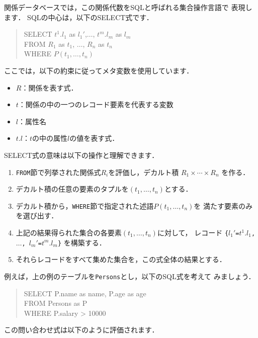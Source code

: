 \documentclass{jbook}
\newenvironment{program}{\begin{quote}\begin{tt}}%
                        {\end{tt}\end{quote}}
\begin{document}
	関係データベースでは，この関係代数をSQLと呼ばれる集合操作言語で
表現します．
	SQLの中心は，以下のSELECT式です．
\begin{program}
SELECT $t^1.l_1$ as $l_1'$,$\ldots$, $t^m.l_m$ as $l_m$\\
FROM $R_1$ as $t_1$, $\ldots$, $R_n$ as $t_n$\\
WHERE $P(t_1,\ldots, t_n)$
\end{program}
	ここでは，以下の約束に従ってメタ変数を使用しています．
\begin{itemize}
\item $R$：関係を表す式．
\item $t$：関係の中の一つのレコード要素を代表する変数
\item $l$：属性名
\item $t.l$：$t$の中の属性$l$の値を表す式．
\end{itemize}
	SELECT式の意味は以下の操作と理解できます．
\begin{enumerate}
\item {\tt FROM}節で列挙された関係式$R_i$を評価し，デカルト積
$
R_1 \times \cdots \times R_n
$
を作る．
\item デカルト積の任意の要素のタプルを$(t_1,\ldots,t_n)$とする．
\item デカルト積から，{\tt WHERE}節で指定された述語$P(t_1,\ldots,t_n)$を
満たす要素のみを選び出す．
\item
	上記の結果得られた集合の各要素$(t_1,\ldots,t_n)$に対して，
レコード
{\tt \{$l_1'$=$t^1.l_1$, $\ldots$, $l_m'$=$t^m.l_m$\}}
を構築する．
\item それらレコードをすべて集めた集合を，この式全体の結果とする．
\end{enumerate}
	例えば，上の例のテーブルを{\tt Persons}とし，以下のSQL式を考えて
みましょう．
\begin{program}
SELECT P.name as name, P.age as age\\
FROM Persons as P\\
WHERE P.salary > 10000
\end{program}
	この問い合わせ式は以下のように評価されます．
\end{document}
